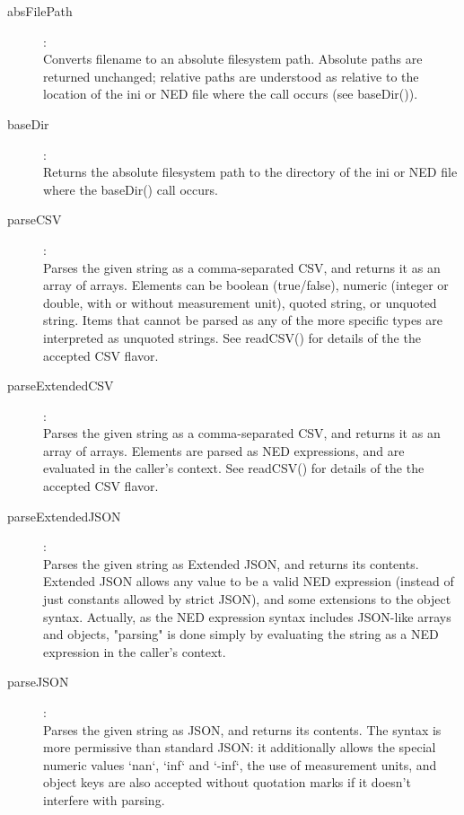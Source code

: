 \begin{description}
\item[absFilePath]:  \\
    Converts filename to an absolute filesystem path. Absolute paths are
    returned unchanged; relative paths are understood as relative to the
    location of the ini or NED file where the call occurs (see baseDir()).

\item[baseDir]:  \\
    Returns the absolute filesystem path to the directory of the ini or NED
    file where the baseDir() call occurs.

\item[parseCSV]:  \\
    Parses the given string as a comma-separated CSV, and returns it as an
    array of arrays. Elements can be boolean (true/false), numeric (integer or
    double, with or without measurement unit), quoted string, or unquoted
    string. Items that cannot be parsed as any of the more specific types are
    interpreted as unquoted strings. See readCSV() for details of the the
    accepted CSV flavor.

\item[parseExtendedCSV]:  \\
    Parses the given string as a comma-separated CSV, and returns it as an
    array of arrays. Elements are parsed as NED expressions, and are evaluated
    in the caller's context. See readCSV() for details of the the accepted CSV
    flavor.

\item[parseExtendedJSON]:  \\
    Parses the given string as Extended JSON, and returns its contents.
    Extended JSON allows any value to be a valid NED expression (instead of
    just constants allowed by strict JSON), and some extensions to the object
    syntax. Actually, as the NED expression syntax includes JSON-like arrays
    and objects, "parsing" is done simply by evaluating the string as a NED
    expression in the caller's context.

\item[parseJSON]:  \\
    Parses the given string as JSON, and returns its contents. The syntax is
    more permissive than standard JSON: it additionally allows the special
    numeric values `nan`, `inf` and `-inf`, the use of measurement units, and
    object keys are also accepted without quotation marks if it doesn't
    interfere with parsing.


\end{description}
